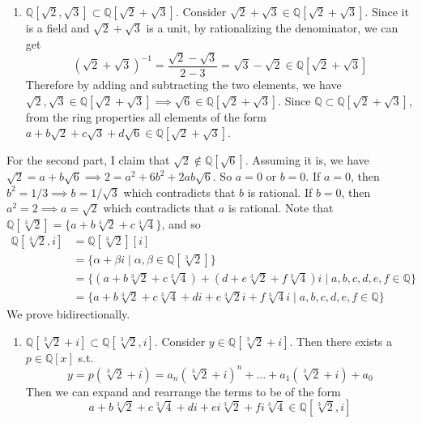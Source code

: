 \begin{solution}
\begin{enumerate}
    \item $\mathbb{Q}[\sqrt{2}, \sqrt{3}] \subset \mathbb{Q}[ \sqrt{2} + \sqrt{3}]$. Consider $\sqrt{2} + \sqrt{3} \in \mathbb{Q}[\sqrt{2} + \sqrt{3}]$. Since it is a field and $\sqrt{2} + \sqrt{3}$ is a unit, by rationalizing the denominator, we can get 
      \begin{equation}
        (\sqrt{2} + \sqrt{3})^{-1} = \frac{\sqrt{2} - \sqrt{3}}{2 - 3} = \sqrt{3} - \sqrt{2} \in \mathbb{Q}[\sqrt{2} + \sqrt{3}]
      \end{equation}
      Therefore by adding and subtracting the two elements, we have $\sqrt{2}, \sqrt{3} \in \mathbb{Q}[\sqrt{2} + \sqrt{3}] \implies \sqrt{6} \in \mathbb{Q}[\sqrt{2} + \sqrt{3}]$. Since $\mathbb{Q} \subset \mathbb{Q}[\sqrt{2} + \sqrt{3}]$, from the ring properties all elements of the form $a + b \sqrt{2} + c \sqrt{3} + d \sqrt{6} \in \mathbb{Q}[\sqrt{2} + \sqrt{3}]$. 
    \end{enumerate}

    For the second part, I claim that $\sqrt{2} \not\in \mathbb{Q}[\sqrt{6}]$. Assuming it is, we have $\sqrt{2} = a + b \sqrt{6} \implies 2 = a^2 + 6b^2 + 2ab \sqrt{6}$. So $a = 0$ or $b = 0$. If $a = 0$, then $b^2 = 1/3 \implies b = 1/\sqrt{3}$ which contradicts that $b$ is rational. If $b = 0$, then $a^2 = 2 \implies a = \sqrt{2}$ which contradicts that $a$ is rational. 
    Note that $\mathbb{Q}[\sqrt[3]{2}] = \{a + b \sqrt[3]{2} + c \sqrt[3]{4}\}$, and so 
    \begin{align}
      \mathbb{Q}[\sqrt[3]{2}, i] & = \mathbb{Q}[\sqrt[3]{2}][i] \\
                                 & = \{\alpha + \beta i \mid \alpha, \beta \in \mathbb{Q}[\sqrt[3]{2}]\} \\
                                 & = \{ (a + b \sqrt[3]{2} + c \sqrt[3]{4}) + (d + e \sqrt[3]{2} + f \sqrt[3]{4}) i \mid a, b, c, d, e, f \in \mathbb{Q}\} \\
                                 & = \{ a + b \sqrt[3]{2} + c \sqrt[3]{4} + d i + e \sqrt[3]{2} i + f \sqrt[3]{4} i \mid a, b, c, d, e, f \in \mathbb{Q}\}
    \end{align}
    We prove bidirectionally. 
    \begin{enumerate}
      \item $\mathbb{Q}[\sqrt[3]{2} + i] \subset \mathbb{Q}[\sqrt[3]{2}, i]$. Consider $y \in \mathbb{Q}[\sqrt[3]{2} + i]$. Then there exists a $p \in \mathbb{Q}[x]$ s.t. 
      \begin{equation}
        y = p(\sqrt[3]{2} + i) = a_n (\sqrt[3]{2} + i)^n + \ldots + a_1 (\sqrt[3]{2} + i) + a_0
      \end{equation}
      Then we can expand and rearrange the terms to be of the form 
      \begin{equation}
        a + b \sqrt[3]{2} + c \sqrt[3]{4} + d i + e i \sqrt[3]{2} + f i \sqrt[3]{4} \in \mathbb{Q}[\sqrt[3]{2}, i]
      \end{equation}


\end{enumerate}
\end{solution}
